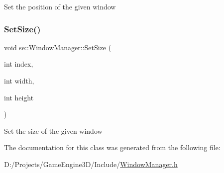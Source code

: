 Set the position of the given window \mbox{\label{classse_1_1_window_manager_a19b8aa0bcc7e96aaf2d29c4c9f3044f6}} 
\subsubsection{\texorpdfstring{Set\+Size()}{SetSize()}}
{\footnotesize\ttfamily void se\+::\+Window\+Manager\+::\+Set\+Size (\begin{DoxyParamCaption}\item[{int}]{index,  }\item[{int}]{width,  }\item[{int}]{height }\end{DoxyParamCaption})}

Set the size of the given window 

The documentation for this class was generated from the following file\+:\begin{DoxyCompactItemize}
\item 
D\+:/\+Projects/\+Game\+Engine3\+D/\+Include/\mbox{\hyperlink{_window_manager_8h}{Window\+Manager.\+h}}\end{DoxyCompactItemize}
